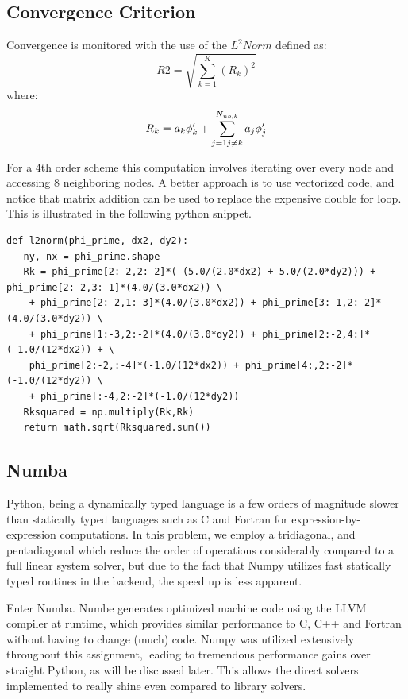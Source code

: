\documentclass[11pt]{article}
\begin{document}
\subsection{Convergence Criterion}
\label{sec-1-3}
Convergence is monitored with the use of the $L^{2}Norm$ defined as:
\[
R2 = \sqrt{ \sum_{k=1}^{K} ( R_{k})^{2} }
\]
where:
\[
R_{k} = a_{k} \phi_{k}^{\prime} + \sum_{j=1 \\ j \neq k}^{N_{nb,k}}  a_{j} \phi_{j}^{\prime}  
\]

For a 4th order scheme this computation involves iterating over every node and accessing 8 neighboring nodes. A better approach is to use vectorized code, and notice that matrix addition can be used to replace the expensive double for loop. This is illustrated in the following python snippet.
\begin{verbatim}
def l2norm(phi_prime, dx2, dy2):
   ny, nx = phi_prime.shape
   Rk = phi_prime[2:-2,2:-2]*(-(5.0/(2.0*dx2) + 5.0/(2.0*dy2))) + phi_prime[2:-2,3:-1]*(4.0/(3.0*dx2)) \
	+ phi_prime[2:-2,1:-3]*(4.0/(3.0*dx2)) + phi_prime[3:-1,2:-2]*(4.0/(3.0*dy2)) \
	+ phi_prime[1:-3,2:-2]*(4.0/(3.0*dy2)) + phi_prime[2:-2,4:]*(-1.0/(12*dx2)) + \
	phi_prime[2:-2,:-4]*(-1.0/(12*dx2)) + phi_prime[4:,2:-2]*(-1.0/(12*dy2)) \
	+ phi_prime[:-4,2:-2]*(-1.0/(12*dy2))
   Rksquared = np.multiply(Rk,Rk)
   return math.sqrt(Rksquared.sum())
\end{verbatim}

\subsection{Numba}
\label{sec-1-4}
Python, being a dynamically typed language is a few orders of magnitude slower than statically typed languages such as C and Fortran for expression-by-expression computations. In this problem, we employ a tridiagonal, and pentadiagonal which reduce the order of operations considerably compared to a full linear system solver, but due to the fact that Numpy utilizes fast statically typed routines in the backend, the speed up is less apparent.  

Enter Numba. Numbe generates optimized machine code using the LLVM compiler at runtime, which provides similar performance to C, C++ and Fortran without having to change (much) code. Numpy was utilized extensively throughout this assignment, leading to tremendous performance gains over straight Python, as will be discussed later. This allows the direct solvers implemented to really shine even compared to library solvers.
\end{document}

